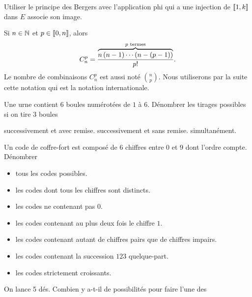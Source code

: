 \documentclass{magnolia}
\begin{document}
\begin{preuve}
  Utiliser le principe des Bergers avec l'application phi qui a une injection
  de $\left\llbracket 1,k\right\rrbracket$ dans $E$ associe son image.
  \end{preuve}

\begin{remarques}
\remarque Si $n\in\mathbb{N}$ et $p\in\left\llbracket 0,n\right\rrbracket$, alors
  \[C_n^p = \frac{\overbrace{n\left(n-1\right)\cdots\left(n-(p-1)\right)}^{\text{$p$ termes}}}{p!}.\]
\remarque Le nombre de combinaisons $C_n^p$ est aussi noté $\binom{n}{p}$. Nous utiliserons par la suite
  cette notation qui est la notation internationale.
\end{remarques}
\vspace{1ex}
\begin{exos}
\exo Une urne contient $6$ boules numérotées de $1$ à $6$. Dénombrer les tirages
  possibles si on tire $3$ boules
  \begin{itemize}
  \question successivement et avec remise.
  \question successivement et sans remise.
  \question simultanément.
  \end{itemize}
\exo Un code de coffre-fort est composé de 6 chiffres entre $0$ et $9$ dont l'ordre
  compte. Dénombrer 
  \begin{itemize}
  \item tous les codes possibles.
  \item les codes dont tous les chiffres sont distincts.
  \item les codes ne contenant pas $0$.
  \item les codes contenant au plus deux fois le chiffre $1$.
  \item les codes contenant autant de chiffres pairs que de chiffres impairs.
  \item les codes contenant la succession $123$ quelque-part.
  \item les codes strictement croissants.
  \end{itemize}
\exo On lance 5 dés. Combien y a-t-il de possibilités pour faire l'une des

\end{exos}
\end{document}

